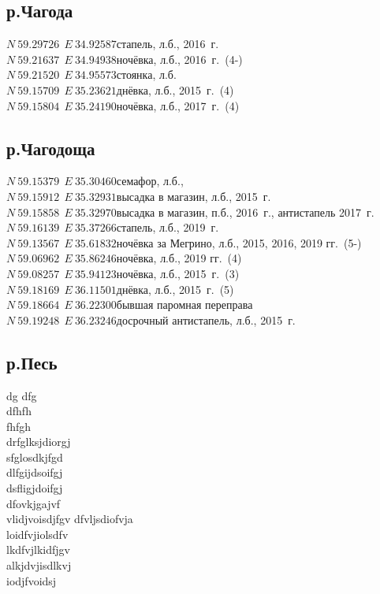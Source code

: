 \subsection*{р.Чагода}
\noindent ${N~59.29726~~E~34.92587}$\mdash стапель, л.б., 2016~г.\\
${N~59.21637~~E~34.94938}$\mdash ночёвка, л.б., 2016~г.~(4-)\\
${N~59.21520~~E~34.95573}$\mdash стоянка, л.б.\\
${N~59.15709~~E~35.23621}$\mdash днёвка, л.б., 2015~г.~(4)\\
${N~59.15804~~E~35.24190}$\mdash ночёвка, л.б., 2017~г.~(4)\\

\subsection*{р.Чагодоща}
${N~59.15379~~E~35.30460}$\mdash семафор, л.б.,\\
${N~59.15912~~E~35.32931}$\mdash высадка в магазин, л.б., 2015~г.\\
${N~59.15858~~E~35.32970}$\mdash высадка в магазин, п.б., 2016~г., антистапель 2017~г.\\
${N~59.16139~~E~35.37266}$\mdash стапель, л.б., 2019~г.\\
${N~59.13567~~E~35.61832}$\mdash ночёвка за Мегрино, л.б., 2015, 2016, 2019 гг.~(5-)\\
${N~59.06962~~E~35.86246}$\mdash ночёвка, л.б., 2019 гг.~(4)\\

${N~59.08257~~E~35.94123}$\mdash ночёвка, л.б., 2015~г.~(3)\\
${N~59.18169~~E~36.11501}$\mdash днёвка, л.б., 2015~г.~(5)\\
${N~59.18664~~E~36.22300}$\mdash бывшая паромная переправа\\
${N~59.19248~~E~36.23246}$\mdash досрочный антистапель, л.б., 2015~г.\\

\subsection*{р.Песь}
dg dfg\\
dfhfh\\
fhfgh\\
drfglksjdiorgj\\
sfglosdkjfgd\\
dlfgijdsoifgj\\
dsfligjdoifgj\\
dfovkjgajvf\\
vlidjvoisdjfgv
dfvljsdiofvja\\
loidfvjiolsdfv\\
lkdfvjlkidfjgv\\
alkjdvjisdlkvj\\
iodjfvoidsj\\